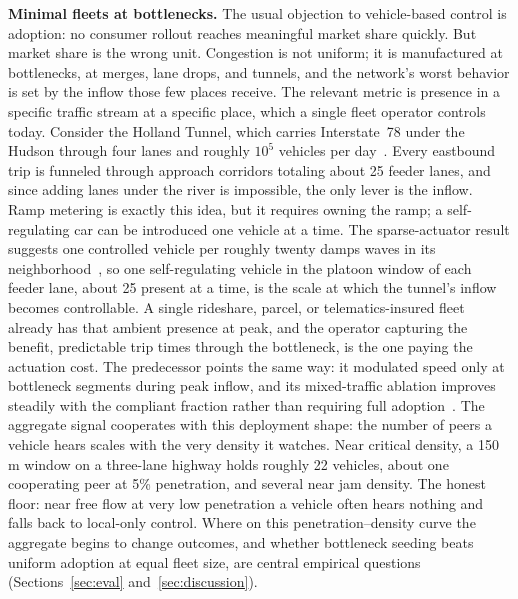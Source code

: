 \noindent\textbf{Minimal fleets at bottlenecks.}
The usual objection to vehicle-based control is adoption: no consumer rollout reaches meaningful market share quickly. But market share is the wrong unit. Congestion is not uniform; it is manufactured at bottlenecks, at merges, lane drops, and tunnels, and the network's worst behavior is set by the inflow those few places receive. The relevant metric is presence in a specific traffic stream at a specific place, which a single fleet operator controls today. Consider the Holland Tunnel, which carries Interstate~78 under the Hudson through four lanes and roughly $10^5$ vehicles per day~\cite{panynj2024traffic}. Every eastbound trip is funneled through approach corridors totaling about 25 feeder lanes, and since adding lanes under the river is impossible, the only lever is the inflow. Ramp metering is exactly this idea, but it requires owning the ramp; a self-regulating car can be introduced one vehicle at a time. The sparse-actuator result suggests one controlled vehicle per roughly twenty damps waves in its neighborhood~\cite{stern2018dissipation}, so one self-regulating vehicle in the platoon window of each feeder lane, about 25 present at a time, is the scale at which the tunnel's inflow becomes controllable. A single rideshare, parcel, or telematics-insured fleet already has that ambient presence at peak, and the operator capturing the benefit, predictable trip times through the bottleneck, is the one paying the actuation cost. The predecessor points the same way: it modulated speed only at bottleneck segments during peak inflow, and its mixed-traffic ablation improves steadily with the compliant fraction rather than requiring full adoption~\cite{self_regulating_cars}. The aggregate signal cooperates with this deployment shape: the number of peers a vehicle hears scales with the very density it watches. Near critical density, a 150\,m window on a three-lane highway holds roughly 22 vehicles, about one cooperating peer at 5\% penetration, and several near jam density. The honest floor: near free flow at very low penetration a vehicle often hears nothing and falls back to local-only control. Where on this penetration--density curve the aggregate begins to change outcomes, and whether bottleneck seeding beats uniform adoption at equal fleet size, are central empirical questions (Sections~\ref{sec:eval} and~\ref{sec:discussion}).
